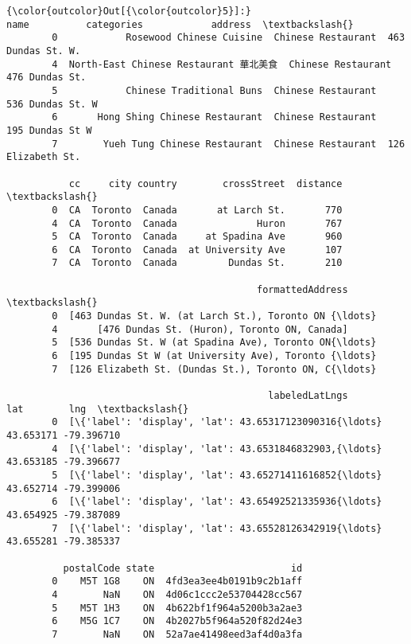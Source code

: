 \documentclass[11pt]{article}
\begin{document}
\begin{Verbatim}[commandchars=\\\{\}]
{\color{outcolor}Out[{\color{outcolor}5}]:}                                  name          categories            address  \textbackslash{}
        0            Rosewood Chinese Cuisine  Chinese Restaurant  463 Dundas St. W.   
        4  North-East Chinese Restaurant 華北美食  Chinese Restaurant     476 Dundas St.   
        5            Chinese Traditional Buns  Chinese Restaurant   536 Dundas St. W   
        6       Hong Shing Chinese Restaurant  Chinese Restaurant    195 Dundas St W   
        7        Yueh Tung Chinese Restaurant  Chinese Restaurant  126 Elizabeth St.   
        
           cc     city country        crossStreet  distance  \textbackslash{}
        0  CA  Toronto  Canada       at Larch St.       770   
        4  CA  Toronto  Canada              Huron       767   
        5  CA  Toronto  Canada     at Spadina Ave       960   
        6  CA  Toronto  Canada  at University Ave       107   
        7  CA  Toronto  Canada         Dundas St.       210   
        
                                            formattedAddress  \textbackslash{}
        0  [463 Dundas St. W. (at Larch St.), Toronto ON {\ldots}   
        4       [476 Dundas St. (Huron), Toronto ON, Canada]   
        5  [536 Dundas St. W (at Spadina Ave), Toronto ON{\ldots}   
        6  [195 Dundas St W (at University Ave), Toronto {\ldots}   
        7  [126 Elizabeth St. (Dundas St.), Toronto ON, C{\ldots}   
        
                                              labeledLatLngs        lat        lng  \textbackslash{}
        0  [\{'label': 'display', 'lat': 43.65317123090316{\ldots}  43.653171 -79.396710   
        4  [\{'label': 'display', 'lat': 43.6531846832903,{\ldots}  43.653185 -79.396677   
        5  [\{'label': 'display', 'lat': 43.65271411616852{\ldots}  43.652714 -79.399006   
        6  [\{'label': 'display', 'lat': 43.65492521335936{\ldots}  43.654925 -79.387089   
        7  [\{'label': 'display', 'lat': 43.65528126342919{\ldots}  43.655281 -79.385337   
        
          postalCode state                        id  
        0    M5T 1G8    ON  4fd3ea3ee4b0191b9c2b1aff  
        4        NaN    ON  4d06c1ccc2e53704428cc567  
        5    M5T 1H3    ON  4b622bf1f964a5200b3a2ae3  
        6    M5G 1C7    ON  4b2027b5f964a520f82d24e3  
        7        NaN    ON  52a7ae41498eed3af4d0a3fa  
\end{Verbatim}
            
\end{document}
